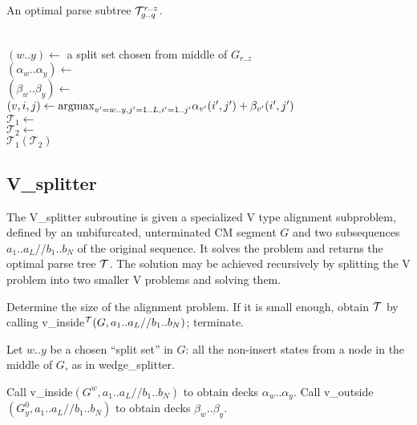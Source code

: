 \documentclass[11pt]{article}
\begin{document}
\begin{algorithm}
         {An optimal parse subtree ${\cal T}^{r..z}_{g..q}$.}

\begin{algtab}
  \algreturn {}\\
\algelse
  $(w..y) \leftarrow$ a split set chosen from middle of $G_{r..z}$\\
  $(\alpha_w..\alpha_y) \leftarrow$ \\
  $(\beta_w..\beta_y)   \leftarrow$ \\
  $(v,i,j) \leftarrow \mbox{\rm{argmax}}_{v'=w..y, j'=1..L, i'=1..j'} 
	\alpha_{v'}(i',j') + \beta_{v'}(i',j')$\\
  $\mathcal{T}_1 \leftarrow$ \\
  $\mathcal{T}_2 \leftarrow$ \\
  \algreturn $\mathcal{T}_1 (\mathcal{T}_2)$\\
\algend
\end{algtab}
\end{algorithm}

\subsection{V\_splitter}

The V\_splitter subroutine is given a specialized V type alignment
subproblem, defined by an unbifurcated, unterminated CM segment $G$
and two subsequences $a_1..a_L//b_1..b_N$ of the original sequence. It
solves the problem and returns the optimal parse tree $\cal{T}$. The
solution may be achieved recursively by splitting the V problem into
two smaller V problems and solving them.

Determine the size of the alignment problem. If it is small enough,
obtain $\cal{T}$ by calling v\_inside$^{\cal{T}}(G, a_1..a_L//b_1..b_N)$;
terminate.

Let $w..y$ be a chosen ``split set'' in $G$: all the non-insert states
from a node in the middle of $G$, as in wedge\_splitter.

Call v\_inside$(G^w, a_1..a_L//b_1..b_N)$ to obtain decks $\alpha_w..\alpha_y$.
Call v\_outside$(G^0_y, a_1..a_L//b_1..b_N)$ to obtain decks $\beta_w..\beta_y$.
\end{document}
